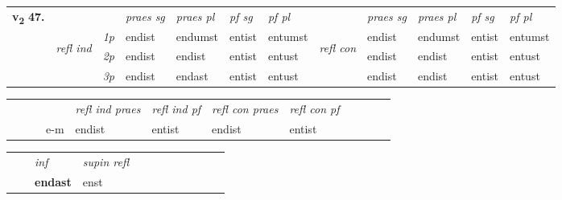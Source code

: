 \begin{tabular}{llllllllllll} \toprule
\multirow{4}{*}{{{\textbf{v{\textsubscript{2}}} \Large{\textbf{47.}}}}}  & &   &  \textit{praes sg}  & \textit{praes pl}  &\textit{pf sg} & \textit{pf pl} &  &  \textit{praes sg}  & \textit{praes pl}  & \textit{pf sg} & \textit{pf pl } \\*
	\cmidrule{4-7} \cmidrule{9-12}
 &\multirow{3}{*}{\begin{turn}{90}\textit{refl ind}\end{turn}} & {\textit{1p}} & endist & endumst    & entist & entumst & \multirow{3}{*}{\begin{turn}{90}\textit{refl con}\end{turn}}  &endist & endumst & entist & entumst\\*
 &&  {\textit{2p}} &  endist  & endist   & entist & entust & &endist & endist & entist & entust \\*
& &  {\textit{3p}} & endist & endast   & entist & entust & & endist & endist& entist & entust  \\*
\cmidrule{4-7} \cmidrule{9-12}
\end{tabular}


\begin{tabular}{llllllllllll}
 & &  & &  \textit{refl ind praes} & \textit{refl ind pf} & \textit{refl con praes} & \textit{refl con pf} \\*
&  & & e-m & endist & entist & endist & entist \\*
\cmidrule{5-9}
\end{tabular}


\begin{tabular}{llllllllllll}
 & & \textit{inf}       & \textit{supin refl}      \\*
  & & \textbf{endast}        & enst  \\*
\cmidrule{1-12}
\end{tabular}




